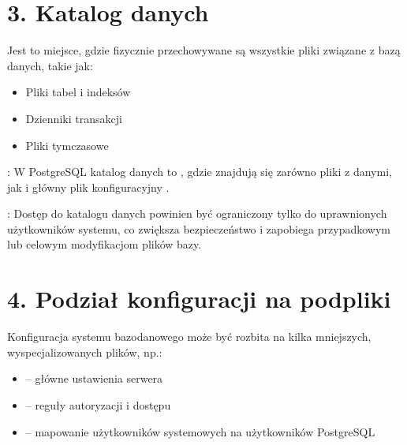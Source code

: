 \documentclass[a4paper,11pt,polish]{sphinxmanual}
\begin{document}
\section{3. Katalog danych}
\label{\detokenize{Konfiguracja_baz_danych/Konfiguracja_baz_danych:katalog-danych}}
\sphinxAtStartPar
Jest to miejsce, gdzie fizycznie przechowywane są wszystkie pliki związane z bazą danych, takie jak:
\begin{itemize}
\item {} 
\sphinxAtStartPar
Pliki tabel i indeksów

\item {} 
\sphinxAtStartPar
Dzienniki transakcji

\item {} 
\sphinxAtStartPar
Pliki tymczasowe

\end{itemize}

\sphinxAtStartPar
{}: W PostgreSQL katalog danych to , gdzie znajdują się zarówno pliki z danymi, jak i główny plik konfiguracyjny .

\sphinxAtStartPar
{}: Dostęp do katalogu danych powinien być ograniczony tylko do uprawnionych użytkowników systemu, co zwiększa bezpieczeństwo i zapobiega przypadkowym lub celowym modyfikacjom plików bazy.


\section{4. Podział konfiguracji na podpliki}
\label{\detokenize{Konfiguracja_baz_danych/Konfiguracja_baz_danych:podzial-konfiguracji-na-podpliki}}
\sphinxAtStartPar
Konfiguracja systemu bazodanowego może być rozbita na kilka mniejszych, wyspecjalizowanych plików, np.:
\begin{itemize}
\item {} 
\sphinxAtStartPar
{} – główne ustawienia serwera

\item {} 
\sphinxAtStartPar
{} – reguły autoryzacji i dostępu

\item {} 
\sphinxAtStartPar
{} – mapowanie użytkowników systemowych na użytkowników PostgreSQL

\end{itemize}
\end{document}
